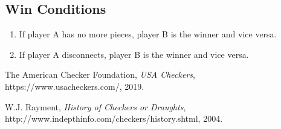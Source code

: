 \documentclass{scrreprt}
\begin{document}
\subsection{Win Conditions}

\begin{enumerate}
    \item If player A has no more pieces, player B is the winner and vice versa.
    \item If player A disconnects, player B is the winner and vice versa.
\end{enumerate}


\begin{thebibliography}{9}

  The American Checker Foundation,
  \textit{USA Checkers},
  https://www.usacheckers.com/,
  2019.

W.J. Rayment,
\textit{History of Checkers or Draughts},
http://www.indepthinfo.com/checkers/history.shtml,
2004.

\end{thebibliography}
\end{document}
